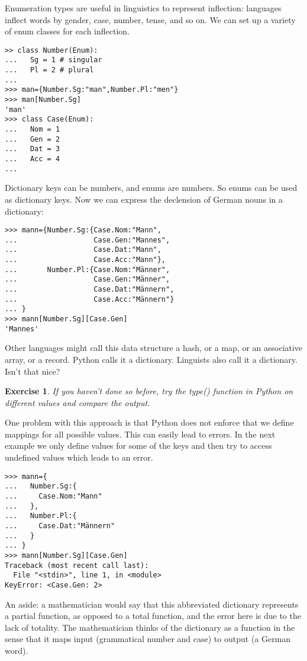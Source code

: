 \documentclass{scrartcl}
\newtheorem{exercise}{Exercise}
\begin{document}
Enumeration types are useful in linguistics to represent inflection: languages inflect words by gender, case, number, tense, and so on. We can set up a variety of enum classes for each inflection.

\begin{verbatim}
>> class Number(Enum):
...   Sg = 1 # singular
...   Pl = 2 # plural
... 
>>> man={Number.Sg:"man",Number.Pl:"men"}
>>> man[Number.Sg]
'man'
>>> class Case(Enum):
...   Nom = 1
...   Gen = 2
...   Dat = 3
...   Acc = 4
... 
\end{verbatim}

Dictionary keys can be numbers, and enums are numbers. So enums can be used as dictionary keys. Now we can express the declension of German nouns in a dictionary:

\begin{verbatim}
>>> mann={Number.Sg:{Case.Nom:"Mann", 
...                  Case.Gen:"Mannes", 
...                  Case.Dat:"Mann", 
...                  Case.Acc:"Mann"},
...       Number.Pl:{Case.Nom:"Männer", 
...                  Case.Gen:"Männer", 
...                  Case.Dat:"Männern", 
...                  Case.Acc:"Männern"}
... }
>>> mann[Number.Sg][Case.Gen]
'Mannes'
\end{verbatim}

Other languages might call this data structure a hash, or a map, or an associative array, or a record. Python calls it a dictionary. Linguists also call it a dictionary. Isn't that nice?

\begin{exercise}
  If you haven't done so before, try the type() function in Python on different values and compare the output. 
\end{exercise}

One problem with this approach is that Python does not enforce that we define mappings for all possible values. This can easily lead to errors. In the next example we only define values for some of the keys and then try to access undefined values which leads to an error.

\begin{verbatim}
>>> mann={
...   Number.Sg:{
...     Case.Nom:"Mann"
...   },
...   Number.Pl:{
...     Case.Dat:"Männern"
...   }
... }
>>> mann[Number.Sg][Case.Gen]
Traceback (most recent call last):
  File "<stdin>", line 1, in <module>
KeyError: <Case.Gen: 2>
\end{verbatim}

An aside: a mathematician would say that this abbreviated dictionary represents a partial function, as opposed to a total function, and the error here is due to the lack of totality. The mathematician thinks of the dictionary as a function in the sense that it maps input (grammatical number and case) to output (a German word).
\end{document}
